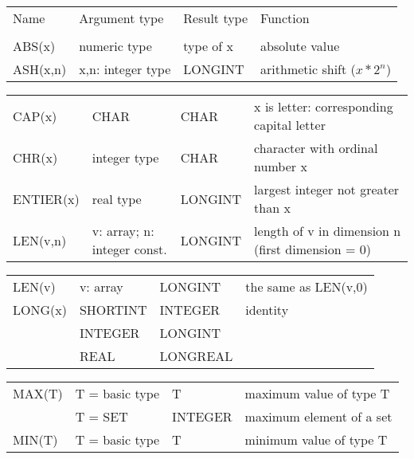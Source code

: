 \begin{flushleft}
\ifcompact \small \fi
\newlength{\FuncName}\settowidth{\FuncName}{ENTIER(x)}
\newlength{\FuncRes}\settowidth{\FuncRes}{LONGREAL}
\newlength{\FuncArg}
\newlength{\FuncFun}
\ifcompact
        \FuncArg=2.5cm
        \FuncFun=3.5cm
\else
        \FuncArg=2.8cm
        \FuncFun=4.4cm
\fi
\begin{tabular}{p{\FuncName}p{\FuncArg}p{\FuncRes}p{\FuncFun}}
Name    & Argument type      & Result type & Function \\
        & \\
ABS(x)  & numeric type       & type of x   & absolute value \\
ASH(x,n) & x,n: integer type & LONGINT     & arithmetic shift ($x*2^n$) \\
\end{tabular}
\begin{tabular}{p{\FuncName}p{\FuncArg}p{\FuncRes}p{\FuncFun}}
CAP(x)  &  CHAR              & CHAR        & x is letter:
                                            corresponding capital letter \\
CHR(x)  &  integer type      & CHAR        & character with ordinal number x \\
ENTIER(x)& real type         & LONGINT     & largest integer not greater than x \\
LEN(v,n) & v: array; n: integer const. & LONGINT
                                           & length of v in dimension n
                                             (first dimension = 0) \\
\end{tabular}
\begin{tabular}{p{\FuncName}p{\FuncArg}p{\FuncRes}p{\FuncFun}}
LEN(v)   & v: array          & LONGINT     & the same as LEN(v,0) \\
LONG(x)  & SHORTINT          & INTEGER     & identity   \\
         & INTEGER           & LONGINT                  \\
         & REAL              & LONGREAL                 \\
\end{tabular}
\begin{tabular}{p{\FuncName}p{\FuncArg}p{\FuncRes}p{\FuncFun}}
MAX(T)   & T = basic type    & T           & maximum value of type T \\
         & T = SET           & INTEGER     & maximum element of a set \\
MIN(T)   & T = basic type    & T           & minimum value of type T \\

\end{tabular}
\end{flushleft}
